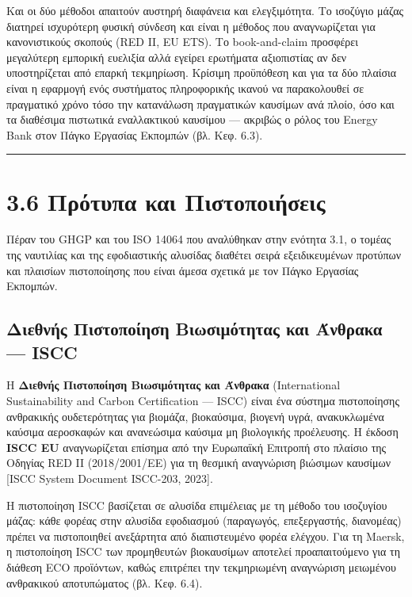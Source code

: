 \documentclass[11pt,a4paper,greek,twoside]{template-xe}
\begin{document}
Και οι δύο μέθοδοι απαιτούν αυστηρή διαφάνεια και ελεγξιμότητα. Το
ισοζύγιο μάζας διατηρεί ισχυρότερη φυσική σύνδεση και είναι η μέθοδος
που αναγνωρίζεται για κανονιστικούς σκοπούς (RED II, EU ETS). Το
book-and-claim προσφέρει μεγαλύτερη εμπορική ευελιξία αλλά εγείρει
ερωτήματα αξιοπιστίας αν δεν υποστηρίζεται από επαρκή τεκμηρίωση.
Κρίσιμη προϋπόθεση και για τα δύο πλαίσια είναι η εφαρμογή ενός
συστήματος πληροφορικής ικανού να παρακολουθεί σε πραγματικό χρόνο τόσο
την κατανάλωση πραγματικών καυσίμων ανά πλοίο, όσο και τα διαθέσιμα
πιστωτικά εναλλακτικού καυσίμου --- ακριβώς ο ρόλος του Energy Bank στον
Πάγκο Εργασίας Εκπομπών (βλ. Κεφ. 6.3).

\begin{center}\rule{0.5\linewidth}{0.5pt}\end{center}

\section{3.6 Πρότυπα και
Πιστοποιήσεις}\label{ux3c0ux3c1ux3ccux3c4ux3c5ux3c0ux3b1-ux3baux3b1ux3b9-ux3c0ux3b9ux3c3ux3c4ux3bfux3c0ux3bfux3b9ux3aeux3c3ux3b5ux3b9ux3c2}

Πέραν του GHGP και του ISO 14064 που αναλύθηκαν στην ενότητα 3.1, ο
τομέας της ναυτιλίας και της εφοδιαστικής αλυσίδας διαθέτει σειρά
εξειδικευμένων προτύπων και πλαισίων πιστοποίησης που είναι άμεσα
σχετικά με τον Πάγκο Εργασίας Εκπομπών.

\subsection{Διεθνής Πιστοποίηση Βιωσιμότητας και Άνθρακα ---
ISCC}\label{ux3b4ux3b9ux3b5ux3b8ux3bdux3aeux3c2-ux3c0ux3b9ux3c3ux3c4ux3bfux3c0ux3bfux3afux3b7ux3c3ux3b7-ux3b2ux3b9ux3c9ux3c3ux3b9ux3bcux3ccux3c4ux3b7ux3c4ux3b1ux3c2-ux3baux3b1ux3b9-ux3acux3bdux3b8ux3c1ux3b1ux3baux3b1-iscc}

Η \textbf{Διεθνής Πιστοποίηση Βιωσιμότητας και Άνθρακα} (International
Sustainability and Carbon Certification --- ISCC) είναι ένα σύστημα
πιστοποίησης ανθρακικής ουδετερότητας για βιομάζα, βιοκαύσιμα, βιογενή
υγρά, ανακυκλωμένα καύσιμα αεροσκαφών και ανανεώσιμα καύσιμα μη
βιολογικής προέλευσης. Η έκδοση \textbf{ISCC EU} αναγνωρίζεται επίσημα
από την Ευρωπαϊκή Επιτροπή στο πλαίσιο της Οδηγίας RED II (2018/2001/ΕΕ)
για τη θεσμική αναγνώριση βιώσιμων καυσίμων {[}ISCC System Document
ISCC-203, 2023{]}.

Η πιστοποίηση ISCC βασίζεται σε αλυσίδα επιμέλειας με τη μέθοδο του
ισοζυγίου μάζας: κάθε φορέας στην αλυσίδα εφοδιασμού (παραγωγός,
επεξεργαστής, διανομέας) πρέπει να πιστοποιηθεί ανεξάρτητα από
διαπιστευμένο φορέα ελέγχου. Για τη Maersk, η πιστοποίηση ISCC των
προμηθευτών βιοκαυσίμων αποτελεί προαπαιτούμενο για τη διάθεση ECO
προϊόντων, καθώς επιτρέπει την τεκμηριωμένη αναγνώριση μειωμένου
ανθρακικού αποτυπώματος (βλ. Κεφ. 6.4).
\end{document}
